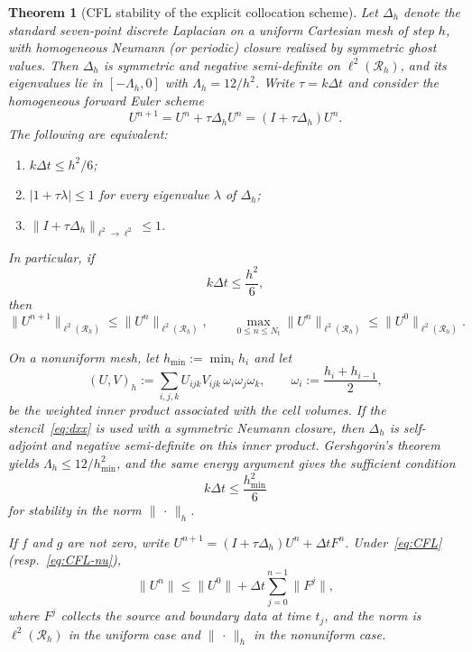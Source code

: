 \documentclass[final,3p,times]{elsarticle}
\theoremstyle{plain}
\newtheorem{theorem}{Theorem}
\theoremstyle{definition}
\theoremstyle{remark}
\begin{document}
\begin{theorem}[CFL stability of the explicit collocation scheme]
\label{thm:scheme}
Let $\Delta_h$ denote the standard seven-point discrete Laplacian on a
uniform Cartesian mesh of step $h$, with homogeneous Neumann (or periodic)
closure realised by symmetric ghost values. Then $\Delta_h$ is symmetric and
negative semi-definite on $\ell^2(\mathcal{R}_h)$, and its eigenvalues lie in
$[-\Lambda_h,0]$ with $\Lambda_h=12/h^2$. Write $\tau=k\Delta t$ and consider
the homogeneous forward Euler scheme
\begin{equation}
\label{eq:euler-hom}
U^{n+1}=U^n+\tau\Delta_h U^n=(I+\tau\Delta_h)U^n.
\end{equation}
The following are equivalent:
\begin{enumerate}
\item $k\Delta t\le h^2/6$;
\item $\lvert 1+\tau\lambda\rvert\le 1$ for every eigenvalue $\lambda$ of
$\Delta_h$;
\item $\lVert I+\tau\Delta_h\rVert_{\ell^2\to\ell^2}\le 1$.
\end{enumerate}
In particular, if
\begin{equation}
\label{eq:CFL}
k\Delta t\le\frac{h^2}{6},
\end{equation}
then
\begin{equation}
\label{eq:l2stab}
\lVert U^{n+1}\rVert_{\ell^2(\mathcal{R}_h)}
\le
\lVert U^n\rVert_{\ell^2(\mathcal{R}_h)},
\qquad
\max_{0\le n\le N_t}\lVert U^n\rVert_{\ell^2(\mathcal{R}_h)}
\le
\lVert U^0\rVert_{\ell^2(\mathcal{R}_h)}.
\end{equation}

On a nonuniform mesh, let $h_{\min}:=\min_i h_i$ and let
\begin{equation}
\label{eq:weighted}
(U,V)_h
:=\sum_{i,j,k}U_{ijk}V_{ijk}\,\omega_i\omega_j\omega_k,
\qquad
\omega_i:=\frac{h_i+h_{i-1}}{2},
\end{equation}
be the weighted inner product associated with the cell volumes. If the
stencil~\eqref{eq:dxx} is used with a symmetric Neumann closure, then
$\Delta_h$ is self-adjoint and negative semi-definite on this inner product.
Gershgorin's theorem yields $\Lambda_h\le 12/h_{\min}^2$, and the same energy
argument gives the sufficient condition
\begin{equation}
\label{eq:CFL-nu}
k\Delta t\le\frac{h_{\min}^2}{6}
\end{equation}
for stability in the norm $\lVert\,\cdot\,\rVert_h$.

If $f$ and $g$ are not zero, write $U^{n+1}=(I+\tau\Delta_h)U^n+\Delta t F^n$.
Under~\eqref{eq:CFL} (resp.~\eqref{eq:CFL-nu}),
\begin{equation}
\label{eq:l2stab-inhom}
\lVert U^n\rVert
\le
\lVert U^0\rVert
+\Delta t\sum_{j=0}^{n-1}\lVert F^j\rVert,
\end{equation}
where $F^j$ collects the source and boundary data at time $t_j$, and the
norm is $\ell^2(\mathcal{R}_h)$ in the uniform case and $\lVert\,\cdot\,\rVert_h$
in the nonuniform case.
\end{theorem}
\end{document}
